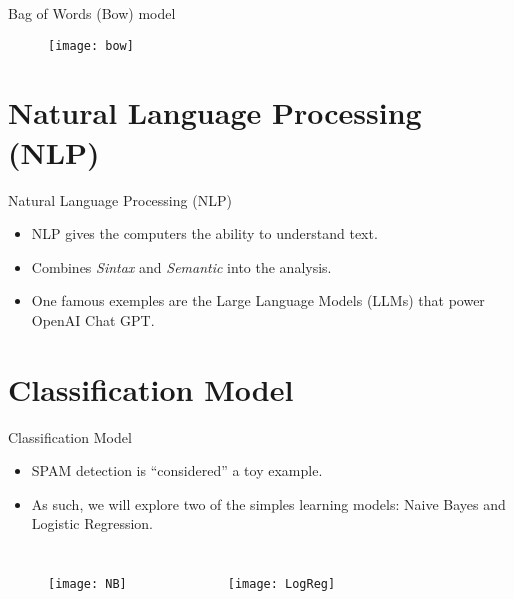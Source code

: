\documentclass[hyperref={hidelinks}]{beamer}
\begin{document}
  \begin{frame}{Bag of Words (Bow) model}
    \begin{figure}
    \centering
    \texttt{[image: bow]}
    \end{figure}
  \end{frame}

  \section{Natural Language Processing (NLP)}
  \begin{frame}{Natural Language Processing (NLP)}
    \begin{itemize}
      \item NLP gives the computers the ability to understand text.
      \item Combines \emph{Sintax} and \emph{Semantic} into the analysis.
      \item One famous exemples are the Large Language Models (LLMs) that power OpenAI Chat GPT.
    \end{itemize}
  \end{frame}

  \section{Classification Model}
  \begin{frame}{Classification Model}
    \begin{itemize}
      \item SPAM detection is ``considered'' a toy example.
      \item As such, we will explore two of the simples learning models: Naive Bayes and Logistic Regression.
    \end{itemize}
    \begin{columns}
      \begin{figure}
        \centering
        \texttt{[image: NB]}
        \end{figure}
      \begin{figure}
        \centering
        \texttt{[image: LogReg]}
        \end{figure}
    \end{columns}
  \end{frame}
\end{document}

